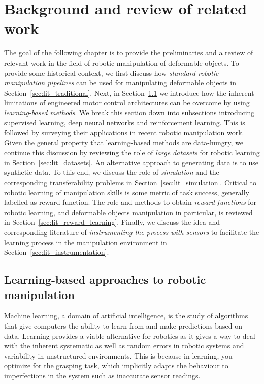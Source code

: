 \documentclass[\home/main.tex]{subfiles}
\begin{document}
\chapter{Background and review of related work} \label{ch:lit}

The goal of the following chapter is to provide the preliminaries and a review of relevant work in the field of robotic manipulation of deformable objects. To provide some historical context, we first discuss how \emph{standard robotic manipulation pipelines} can be used for manipulating deformable objects in Section~\ref{sec:lit_traditional}. Next, in Section~\ref{sec:lit_learning} we introduce how the inherent limitations of engineered motor control architectures can be overcome by using \emph{learning-based methods}. We break this section down into subsections introducing supervised learning, deep neural networks and reinforcement learning. This is followed by surveying their applications in recent robotic manipulation work. Given the general property that learning-based methods are data-hungry, we continue this discussion by reviewing the role of \emph{large datasets} for robotic learning in Section~\ref{sec:lit_datasets}. An alternative approach to generating data is to use synthetic data. To this end, we discuss the role of \emph{simulation} and the corresponding transferability problems in Section~\ref{sec:lit_simulation}. Critical to robotic learning of manipulation skills is some metric of task success, generally labelled as reward function. The role and methods to obtain \emph{reward functions} for robotic learning, and deformable objects manipulation in particular, is reviewed in Section~\ref{sec:lit_reward_learning}. Finally, we discuss the idea and corresponding literature of \emph{instrumenting the process with sensors} to facilitate the learning process in the manipulation environment in Section~\ref{sec:lit_instrumentation}.



\section{Learning-based approaches to robotic manipulation} \label{sec:lit_learning}

Machine learning, a domain of artificial intelligence, is the study of algorithms that give computers the ability to learn from and make predictions based on data. Learning provides a viable alternative for robotics as it gives a way to deal with the inherent systematic as well as random errors in robotic systems and variability in unstructured environments. This is because in learning, you optimize for the grasping task, which implicitly adapts the behaviour to imperfections in the system such as inaccurate sensor readings.
\end{document}
